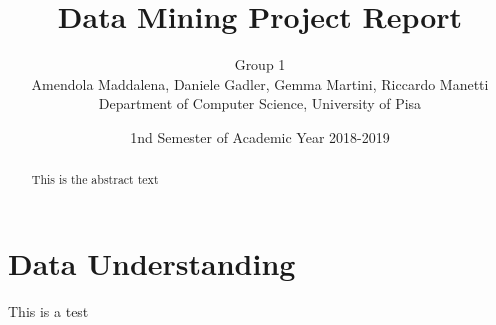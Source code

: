 \documentclass[a4paper]{article}
\title{Data Mining Project Report}
\author{  Group 1\\
Amendola Maddalena, Daniele Gadler, Gemma Martini, Riccardo Manetti  \\Department of Computer Science, University of Pisa \\}
\date{ 1nd Semester of Academic Year 2018-2019}
\begin{document}
\renewcommand{\abstractname}{Summary}

\maketitle

\begin{abstract}
   This is the abstract text
\end{abstract}


\section{Data Understanding}

This is a test







\end{document}
